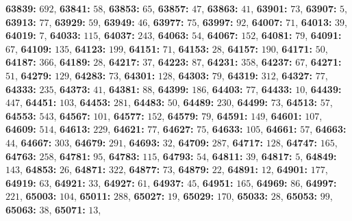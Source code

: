 \textsf{\bfseries 63839:} $692$, \textsf{\bfseries 63841:} $58$, \textsf{\bfseries 63853:} $65$, \textsf{\bfseries 63857:} $47$, \textsf{\bfseries 63863:} $41$, \textsf{\bfseries 63901:} $73$, \textsf{\bfseries 63907:} $5$, \textsf{\bfseries 63913:} $77$, \textsf{\bfseries 63929:} $59$, \textsf{\bfseries 63949:} $46$, \textsf{\bfseries 63977:} $75$, \textsf{\bfseries 63997:} $92$, \textsf{\bfseries 64007:} $71$, \textsf{\bfseries 64013:} $39$, \textsf{\bfseries 64019:} $7$, \textsf{\bfseries 64033:} $115$, \textsf{\bfseries 64037:} $243$, \textsf{\bfseries 64063:} $54$, \textsf{\bfseries 64067:} $152$, \textsf{\bfseries 64081:} $79$, \textsf{\bfseries 64091:} $67$, \textsf{\bfseries 64109:} $135$, \textsf{\bfseries 64123:} $199$, \textsf{\bfseries 64151:} $71$, \textsf{\bfseries 64153:} $28$, \textsf{\bfseries 64157:} $190$, \textsf{\bfseries 64171:} $50$, \textsf{\bfseries 64187:} $366$, \textsf{\bfseries 64189:} $28$, \textsf{\bfseries 64217:} $37$, \textsf{\bfseries 64223:} $87$, \textsf{\bfseries 64231:} $358$, \textsf{\bfseries 64237:} $67$, \textsf{\bfseries 64271:} $51$, \textsf{\bfseries 64279:} $129$, \textsf{\bfseries 64283:} $73$, \textsf{\bfseries 64301:} $128$, \textsf{\bfseries 64303:} $79$, \textsf{\bfseries 64319:} $312$, \textsf{\bfseries 64327:} $77$, \textsf{\bfseries 64333:} $235$, \textsf{\bfseries 64373:} $41$, \textsf{\bfseries 64381:} $88$, \textsf{\bfseries 64399:} $186$, \textsf{\bfseries 64403:} $77$, \textsf{\bfseries 64433:} $10$, \textsf{\bfseries 64439:} $447$, \textsf{\bfseries 64451:} $103$, \textsf{\bfseries 64453:} $281$, \textsf{\bfseries 64483:} $50$, \textsf{\bfseries 64489:} $230$, \textsf{\bfseries 64499:} $73$, \textsf{\bfseries 64513:} $57$, \textsf{\bfseries 64553:} $543$, \textsf{\bfseries 64567:} $101$, \textsf{\bfseries 64577:} $152$, \textsf{\bfseries 64579:} $79$, \textsf{\bfseries 64591:} $149$, \textsf{\bfseries 64601:} $107$, \textsf{\bfseries 64609:} $514$, \textsf{\bfseries 64613:} $229$, \textsf{\bfseries 64621:} $77$, \textsf{\bfseries 64627:} $75$, \textsf{\bfseries 64633:} $105$, \textsf{\bfseries 64661:} $57$, \textsf{\bfseries 64663:} $44$, \textsf{\bfseries 64667:} $303$, \textsf{\bfseries 64679:} $291$, \textsf{\bfseries 64693:} $32$, \textsf{\bfseries 64709:} $287$, \textsf{\bfseries 64717:} $128$, \textsf{\bfseries 64747:} $165$, \textsf{\bfseries 64763:} $258$, \textsf{\bfseries 64781:} $95$, \textsf{\bfseries 64783:} $115$, \textsf{\bfseries 64793:} $54$, \textsf{\bfseries 64811:} $39$, \textsf{\bfseries 64817:} $5$, \textsf{\bfseries 64849:} $143$, \textsf{\bfseries 64853:} $26$, \textsf{\bfseries 64871:} $322$, \textsf{\bfseries 64877:} $73$, \textsf{\bfseries 64879:} $22$, \textsf{\bfseries 64891:} $12$, \textsf{\bfseries 64901:} $177$, \textsf{\bfseries 64919:} $63$, \textsf{\bfseries 64921:} $33$, \textsf{\bfseries 64927:} $61$, \textsf{\bfseries 64937:} $45$, \textsf{\bfseries 64951:} $165$, \textsf{\bfseries 64969:} $86$, \textsf{\bfseries 64997:} $221$, \textsf{\bfseries 65003:} $104$, \textsf{\bfseries 65011:} $288$, \textsf{\bfseries 65027:} $19$, \textsf{\bfseries 65029:} $170$, \textsf{\bfseries 65033:} $28$, \textsf{\bfseries 65053:} $99$, \textsf{\bfseries 65063:} $38$, \textsf{\bfseries 65071:} $13$, 
